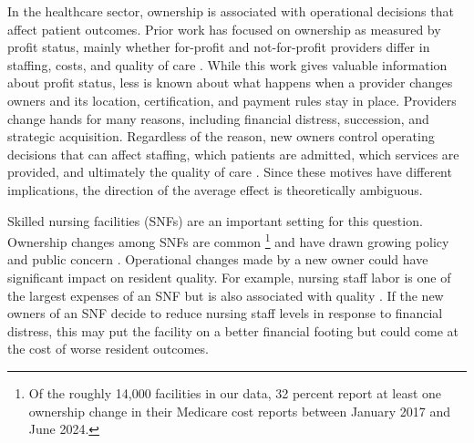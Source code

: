 \documentclass[12pt]{article}
\begin{document}
In the healthcare sector, ownership is associated with operational decisions that affect patient outcomes. Prior work has focused on ownership as measured by profit status, mainly whether for-profit and not-for-profit providers differ in staffing, costs, and quality of care \citep{grabowski_stevenson_2008, eggleston_et_al_2008, comondore_et_al_2009, holmes_1996}. While this work gives valuable information about profit status, less is known about what happens when a provider changes owners and its location, certification, and payment rules stay in place. Providers change hands for many reasons, including financial distress, succession, and strategic acquisition. Regardless of the reason, new owners control operating decisions that can affect staffing, which patients are admitted, which services are provided, and ultimately the quality of care \citep{bowblis_2011, lu_lu_2022}. Since these motives have different implications, the direction of the average effect is theoretically ambiguous.

Skilled nursing facilities (SNFs) are an important setting for this question. Ownership changes among SNFs are common \citep{prusynski_humbert_mroz_2023, OliveiraBlanco2024}\footnote{Of the roughly 14,000 facilities in our data, 32 percent report at least one ownership change in their Medicare cost reports between January 2017 and June 2024.} and have drawn growing policy and public concern \citep{Khan2024PrivateCapital,MurphyScanlon2026, AFREF2026PEPolling, HealthcareDive2025PEReport}. Operational changes made by a new owner could have significant impact on resident quality. For example, nursing staff labor is one of the largest expenses of an SNF \citep{hawk_et_al_2022} but is also associated with quality \citep{bowblis_brunt_2025, lin_2014, zhang_grabowski_2004, harrington_et_al_2000}. If the new owners of an SNF decide to reduce nursing staff levels in response to financial distress, this may put the facility on a better financial footing but could come at the cost of worse resident outcomes.
\end{document}
